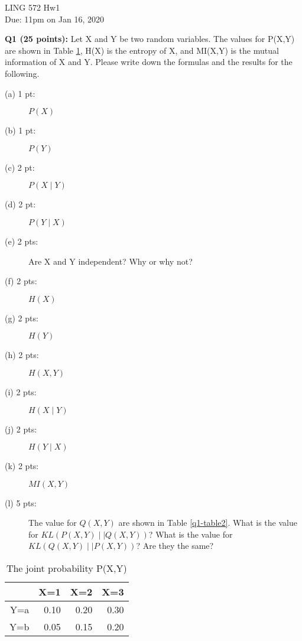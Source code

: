 \documentclass[11pt]{article}
\begin{document}
\begin{center}
\LARGE
LING 572 Hw1\\
Due: 11pm on Jan 16, 2020\\
\vspace{0.3in}
\end{center}


\vspace{0.2 in}
\hspace{-0.3in}
{\bf Q1 (25 points):} Let X and Y be two random variables. 
  The values for P(X,Y) are shown in Table \ref{q1-table1},
  H(X) is the entropy of X, and MI(X,Y) is the mutual information of X and Y.
  Please write down the formulas and the results for the following.

\begin{description}
   \item [(a) 1 pt:] $P(X)$
   \item [(b) 1 pt:] $P(Y)$
   \item [(c) 2 pt:] $P(X \mid Y)$
   \item [(d) 2 pt:] $P(Y \mid X)$
   \item [(e) 2 pts:] Are X and Y independent? Why or why not?

   \item [(f) 2 pts:] $H(X)$
   \item [(g) 2 pts:] $H(Y)$
   \item [(h) 2 pts:] $H(X,Y)$
   \item [(i) 2 pts:] $H(X \mid Y)$
   \item [(j) 2 pts:] $H(Y \mid X)$

   \item [(k) 2 pts:] $MI(X,Y)$
   \item [(l) 5 pts:] 
       The value for $Q(X,Y)$ are shown in Table \ref{q1-table2}.
                What is the value for $KL(P(X,Y) \mid\mid Q(X,Y))$?
                What is the value for $KL(Q(X,Y) \mid\mid P(X,Y))$?
                Are they the same?
\end{description}

\begin{table}[btph]
\centering
\caption{The joint probability P(X,Y)}
\label{q1-table1}
\begin{tabular}{|r|r|r|r|}  \hline
    & X=1 & X=2 & X=3 \\ \hline
Y=a & 0.10 & 0.20 &  0.30 \\ \hline 
Y=b & 0.05 & 0.15 &  0.20 \\ \hline
\end{tabular}
\end{table}
\end{document}
